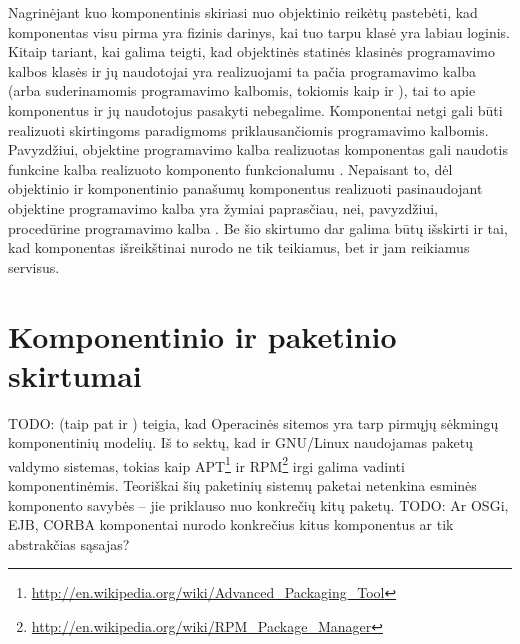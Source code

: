 Nagrinėjant kuo komponentinis skiriasi nuo objektinio reikėtų
pastebėti, kad komponentas visu pirma yra fizinis darinys, kai tuo
tarpu klasė yra labiau loginis. Kitaip tariant, kai galima teigti,
kad objektinės statinės klasinės programavimo kalbos klasės ir jų
naudotojai yra realizuojami ta pačia programavimo
kalba (arba suderinamomis programavimo kalbomis, tokiomis kaip
 ir ), tai to apie komponentus ir jų
naudotojus pasakyti nebegalime. Komponentai netgi gali būti realizuoti
skirtingoms paradigmoms priklausančiomis programavimo kalbomis.
Pavyzdžiui, objektine programavimo kalba realizuotas komponentas gali
naudotis funkcine kalba realizuoto komponento
funkcionalumu \cite[36]{heineman2001component}. Nepaisant to,
dėl objektinio ir komponentinio panašumų komponentus realizuoti
pasinaudojant objektine programavimo kalba yra žymiai paprasčiau,
nei, pavyzdžiui, procedūrine programavimo kalba \cite{what-to-compose}.
Be šio skirtumo dar galima būtų išskirti ir tai, kad komponentas
išreikštinai nurodo ne tik teikiamus, bet ir jam reikiamus
servisus.

\section{Komponentinio ir paketinio skirtumai}

TODO: 
\cite{cs-beyond-object-oriented-programming} (taip pat ir
\cite[34]{heineman2001component}) teigia, kad Operacinės sitemos
yra tarp pirmųjų sėkmingų komponentinių modelių. Iš to sektų,
kad ir GNU/Linux naudojamas paketų valdymo sistemas, tokias kaip
APT\footnote{\url{http://en.wikipedia.org/wiki/Advanced_Packaging_Tool}}
ir RPM\footnote{\url{http://en.wikipedia.org/wiki/RPM_Package_Manager}}
irgi galima vadinti komponentinėmis. Teoriškai šių paketinių
sistemų paketai netenkina esminės komponento savybės – jie priklauso
nuo konkrečių kitų paketų. TODO: Ar OSGi, EJB, CORBA komponentai
nurodo konkrečius kitus komponentus ar tik abstrakčias sąsajas?
